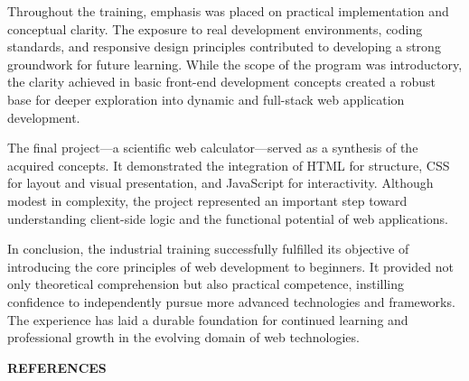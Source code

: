 \documentclass[a4paper,12pt,oneside]{report}
\numberwithin{equation}{chapter}
\numberwithin{figure}{chapter}
\numberwithin{table}{chapter}
\begin{document}
Throughout the training, emphasis was placed on practical implementation and conceptual clarity. The exposure to real development environments, coding standards, and responsive design principles contributed to developing a strong groundwork for future learning. While the scope of the program was introductory, the clarity achieved in basic front-end development concepts created a robust base for deeper exploration into dynamic and full-stack web application development.

The final project—a scientific web calculator—served as a synthesis of the acquired concepts. It demonstrated the integration of HTML for structure, CSS for layout and visual presentation, and JavaScript for interactivity. Although modest in complexity, the project represented an important step toward understanding client-side logic and the functional potential of web applications.

In conclusion, the industrial training successfully fulfilled its objective of introducing the core principles of web development to beginners. It provided not only theoretical comprehension but also practical competence, instilling confidence to independently pursue more advanced technologies and frameworks. The experience has laid a durable foundation for continued learning and professional growth in the evolving domain of web technologies.


\newpage
\begin{center}
    \Large\textbf{REFERENCES}
\end{center}
\end{document}
